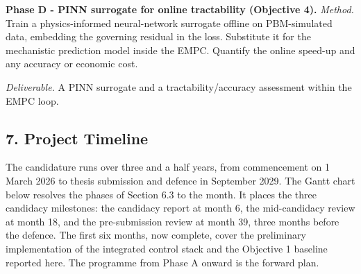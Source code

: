 \documentclass[
  14pt,
]{extarticle}
\begin{document}
\textbf{Phase D - PINN surrogate for online tractability (Objective 4).}
\emph{Method.} Train a physics-informed neural-network surrogate offline
on PBM-simulated data, embedding the governing residual in the loss.
Substitute it for the mechanistic prediction model inside the EMPC.
Quantify the online speed-up and any accuracy or economic cost.

\emph{Deliverable.} A PINN surrogate and a tractability/accuracy
assessment within the EMPC loop.

\subsection{7. Project Timeline}\label{project-timeline}

The candidature runs over three and a half years, from commencement on 1
March 2026 to thesis submission and defence in September 2029. The Gantt
chart below resolves the phases of Section 6.3 to the month. It places
the three candidacy milestones: the candidacy report at month 6, the
mid-candidacy review at month 18, and the pre-submission review at month
39, three months before the defence. The first six months, now complete,
cover the preliminary implementation of the integrated control stack and
the Objective 1 baseline reported here. The programme from Phase A
onward is the forward plan.
\end{document}
